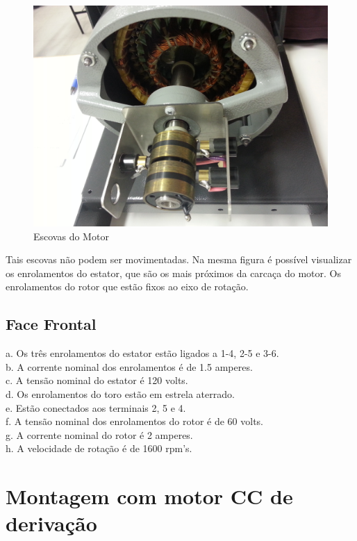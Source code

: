 \documentclass[paper=a4, fontsize=11pt]{article}
\begin{document}
\begin{figure}[!ht]
    \centering
    \includegraphics[scale=0.1]{20140326_172725.jpg}
    \caption{Escovas do Motor}
    \label{fig:escovasmotor}
\end{figure}

Tais escovas não podem ser movimentadas. Na mesma figura 
é possível visualizar os enrolamentos do estator, que são
os mais próximos da carcaça do motor. Os enrolamentos do
rotor que estão fixos ao eixo de rotação.

\subsection{Face Frontal}

a. Os três enrolamentos do estator estão ligados a 1-4, 2-5 e 3-6.\\
b. A corrente nominal dos enrolamentos é de 1.5 amperes.\\
c. A tensão nominal do estator é 120 volts.\\
d. Os enrolamentos do toro estão em estrela aterrado.\\
e. Estão conectados aos terminais 2, 5 e 4.\\
f. A tensão nominal dos enrolamentos do rotor é de 60 volts.\\
g. A corrente nominal do rotor é 2 amperes.\\
h. A velocidade de rotação é de 1600 rpm's.\\

\section{Montagem com motor CC de derivação}
\end{document}
